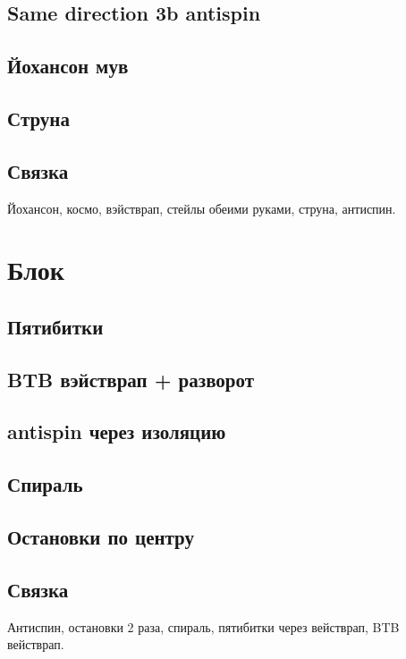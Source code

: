 \documentclass[a4paper, 12pt]{article}
\begin{document}
	\subsection{Same direction 3b antispin}
	\subsection{Йохансон мув}
	\subsection{Струна}
	\subsection{Связка}
	Йохансон, космо, вэйстврап, стейлы обеими руками, струна, антиспин.
	
	\section{Блок}
	
	\subsection{Пятибитки}
	\subsection{BTB вэйстврап + разворот}
	\subsection{antispin через изоляцию}
	\subsection{Спираль}
	\subsection{Остановки по центру}
	\subsection{Связка}
	Антиспин, остановки 2 раза, спираль, пятибитки через вействрап, BTB вействрап.
	  
	
	
	
	
	
\end{document}
